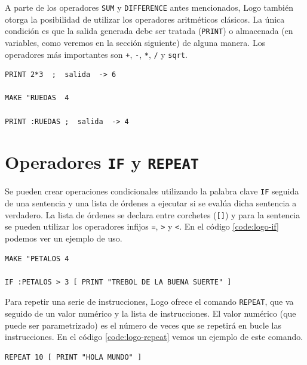 A parte de los operadores \texttt{SUM} y \texttt{DIFFERENCE} antes mencionados, Logo también otorga la posibilidad de utilizar los operadores aritméticos clásicos. La única condición es que la salida generada debe ser tratada (\texttt{PRINT}) o almacenada (en variables, como veremos en la sección siguiente) de alguna manera. Los operadores más importantes son \texttt{+}, \texttt{-}, \texttt{*}, \texttt{/} y \texttt{sqrt}.

\begin{lstlisting}[language={Logo}, label={code:logo-operadores-aritmeticos}, caption=Ejemplo de uso de operadores aritméticos en el lenguaje Logo.]
PRINT 2*3  ;  salida  -> 6

MAKE "RUEDAS  4

PRINT :RUEDAS ;  salida  -> 4
\end{lstlisting}


\section{Operadores \texttt{IF} y \texttt{REPEAT}}

Se pueden crear operaciones condicionales utilizando la palabra clave \texttt{IF} seguida de una sentencia y una lista de órdenes a ejecutar si se evalúa dicha sentencia a verdadero. La lista de órdenes se declara entre corchetes (\texttt{[]}) y para la sentencia se pueden utilizar los operadores infijos \texttt{=}, \texttt{>} y \texttt{<}. En el código \ref{code:logo-if} podemos ver un ejemplo de uso.

\begin{lstlisting}[language=Logo,label={code:logo-if}, caption=Condiciones en el lenguaje logo con el operador \texttt{IF}.]
MAKE "PETALOS 4

IF :PETALOS > 3 [ PRINT "TREBOL DE LA BUENA SUERTE" ]
\end{lstlisting}

Para repetir una serie de instrucciones, Logo ofrece el comando \texttt{REPEAT}, que va seguido de un valor numérico y la lista de instrucciones. El valor numérico (que puede ser parametrizado) es el número de veces que se repetirá en bucle las instrucciones. En el código \ref{code:logo-repeat} vemos un ejemplo de este comando.


\begin{lstlisting}[language=Logo,label={code:logo-repeat}, caption=Condiciones en el lenguaje logo con el operador \texttt{IF}.]
REPEAT 10 [ PRINT "HOLA MUNDO" ]
\end{lstlisting}





